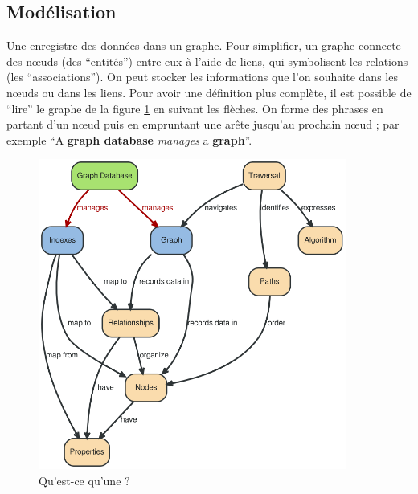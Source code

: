 \subsection{Modélisation}
	Une \bddGraphe{} enregistre des données dans un graphe. Pour simplifier, un graphe connecte des nœuds (des \enquote{entités}) entre eux à l'aide de liens, qui symbolisent les relations (les \enquote{associations}). On peut stocker les informations que l'on souhaite dans les nœuds ou dans les liens. Pour avoir une définition plus complète, il est possible de \enquote{lire} le graphe de la figure \ref{bddGrapheSVG} en suivant les flèches. On forme des phrases en partant d'un nœud puis en empruntant une arête jusqu'au prochain nœud ; par exemple \enquote{A \textbf{graph database} \textit{manages} a \textbf{graph}}.

	\begin{figure}[H]
		\centering
		\includegraphics[width=0.9\textwidth]{images/bddGraphe.png}
		\caption{Qu'est-ce qu'une \bddGraphe{} ? \cite{bddGrapheSchema}}
		\label{bddGrapheSVG}
	\end{figure}

